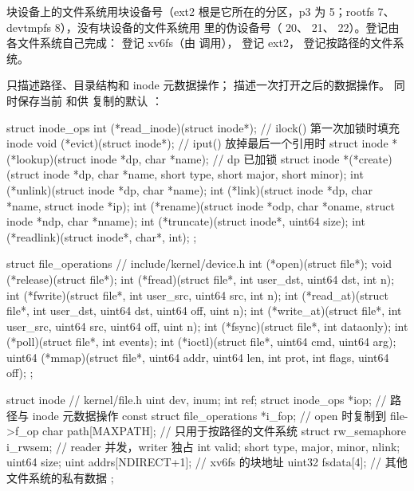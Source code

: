 块设备上的文件系统用块设备号（ext2 根是它所在的分区，p3 为 5；rootfs 7、devtmpfs 8），没有块设备的文件系统用  里的伪设备号（ 20、 21、 22）。登记由各文件系统自己完成： 登记 xv6fs（由  调用）， 登记 ext2， 登记按路径的文件系统。

 只描述路径、目录结构和 inode 元数据操作； 描述一次打开之后的数据操作。 同时保存当前  和供  复制的默认 ：

\begin{ccode}
struct inode_ops {
  int  (*read_inode)(struct inode*);             // ilock() 第一次加锁时填充 inode
  void (*evict)(struct inode*);                  // iput() 放掉最后一个引用时
  struct inode *(*lookup)(struct inode *dp, char *name);   // dp 已加锁
  struct inode *(*create)(struct inode *dp, char *name,
                          short type, short major, short minor);
  int  (*unlink)(struct inode *dp, char *name);
  int  (*link)(struct inode *dp, char *name, struct inode *ip);
  int  (*rename)(struct inode *odp, char *oname, struct inode *ndp, char *nname);
  int  (*truncate)(struct inode*, uint64 size);
  int  (*readlink)(struct inode*, char*, int);
};

struct file_operations {          // include/kernel/device.h
  int  (*open)(struct file*);
  void (*release)(struct file*);
  int  (*fread)(struct file*, int user_dst, uint64 dst, int n);
  int  (*fwrite)(struct file*, int user_src, uint64 src, int n);
  int  (*read_at)(struct file*, int user_dst, uint64 dst, uint64 off, uint n);
  int  (*write_at)(struct file*, int user_src, uint64 src, uint64 off, uint n);
  int  (*fsync)(struct file*, int dataonly);
  int  (*poll)(struct file*, int events);
  int  (*ioctl)(struct file*, uint64 cmd, uint64 arg);
  uint64 (*mmap)(struct file*, uint64 addr, uint64 len,
                 int prot, int flags, uint64 off);
};

struct inode {                   // kernel/file.h
  uint dev, inum;  int ref;
  struct inode_ops *iop;         // 路径与 inode 元数据操作
  const struct file_operations *i_fop; // open 时复制到 file->f_op
  char path[MAXPATH];            // 只用于按路径的文件系统
  struct rw_semaphore i_rwsem;   // reader 并发，writer 独占
  int valid;
  short type, major, minor, nlink;  uint64 size;
  uint addrs[NDIRECT+1];         // xv6fs 的块地址
  uint32 fsdata[4];              // 其他文件系统的私有数据
};
\end{ccode}

